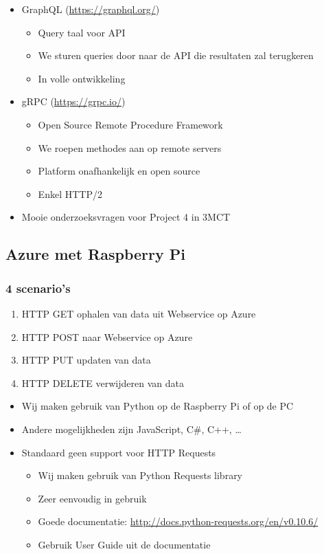 \documentclass{article}
\begin{document}
\begin{itemize}
    \item GraphQL (\url{https://graphql.org/})
    \begin{itemize}
        \item Query taal voor API
        \item We sturen queries door naar de API die resultaten zal terugkeren
        \item In volle ontwikkeling
    \end{itemize}
    \item gRPC (\url{https://grpc.io/})
    \begin{itemize}
        \item Open Source Remote Procedure Framework
        \item We roepen methodes aan op remote servers
        \item Platform onafhankelijk en open source
        \item Enkel HTTP/2
    \end{itemize}
    \item Mooie onderzoeksvragen voor Project 4 in 3MCT
\end{itemize}

\subsection{Azure met Raspberry Pi}
\subsubsection{4 scenario's}

\begin{enumerate}
    \item HTTP GET ophalen van data uit Webservice op Azure
    \item HTTP POST naar Webservice op Azure
    \item HTTP PUT updaten van data
    \item HTTP DELETE verwijderen van data
\end{enumerate}

\begin{itemize}
    \item Wij maken gebruik van Python op de Raspberry Pi of op de PC
    \item Andere mogelijkheden zijn JavaScript, C\#, C++, \dots
    \item Standaard geen support voor HTTP Requests
    \begin{itemize}
        \item Wij maken gebruik van Python Requests library
        \item Zeer eenvoudig in gebruik
        \item Goede documentatie: \url{http://docs.python-requests.org/en/v0.10.6/}
        \item Gebruik User Guide uit de documentatie
    \end{itemize}
\end{itemize}
\end{document}
